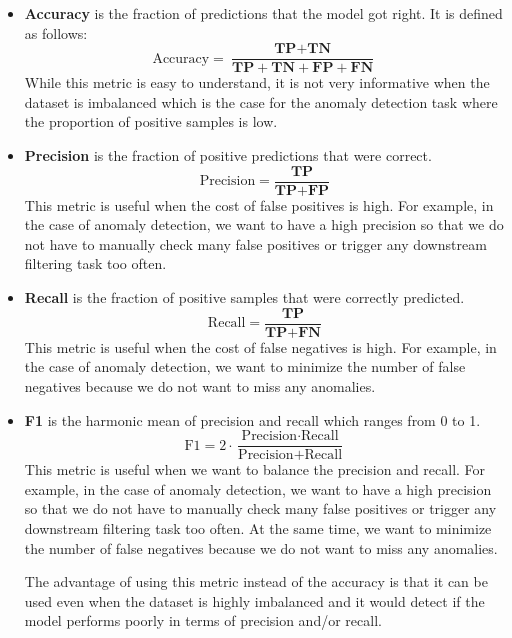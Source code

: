 \documentclass[a4paper, twoside]{report}
\theoremstyle{definition}
\numberwithin{equation}{section}
\begin{document}
\begin{itemize}
    \item \textbf{Accuracy} is the fraction of predictions that the model got right.
          It is defined as follows:
          $$\text{Accuracy}=\frac{\textbf{TP}+\textbf{TN}}{\textbf{TP}+\textbf{TN}+\textbf{FP}+\textbf{FN}}$$
          While this metric is easy to understand, it is not very informative when the dataset is imbalanced
          which is the case for the anomaly detection task where the proportion
          of positive samples is low.

    \item \textbf{Precision} is the fraction of positive predictions that were correct.
          $$\text{Precision}=\frac{\textbf{TP}}{\textbf{TP}+\textbf{FP}}$$
          This metric is useful when the cost of false positives is high.
          For example, in the case of anomaly detection, we want to have
          a high precision so that we do not have to manually check many false positives
          or trigger any downstream filtering task too often.

    \item \textbf{Recall} is the fraction of positive samples that were correctly predicted.
          $$\text{Recall}=\frac{\textbf{TP}}{\textbf{TP}+\textbf{FN}}$$
          This metric is useful when the cost of false negatives is high.
          For example, in the case of anomaly detection, we want to minimize the number of false negatives
          because we do not want to miss any anomalies.

    \item \textbf{F1} is the harmonic mean of precision and recall which ranges from 0 to 1.
          $$\text{F1}=2\cdot\frac{\text{Precision}\cdot\text{Recall}}{\text{Precision}+\text{Recall}}$$
          This metric is useful when we want to balance the precision and recall.
          For example, in the case of anomaly detection, we want to have a high precision
          so that we do not have to manually check many false positives
          or trigger any downstream filtering task too often.
          At the same time, we want to minimize the number of false negatives
          because we do not want to miss any anomalies.

          The advantage of using this metric instead of the accuracy is that it
          can be used even when the dataset is highly imbalanced and it would
          detect if the model performs poorly in terms of precision and/or recall.
\end{itemize}
\end{document}
